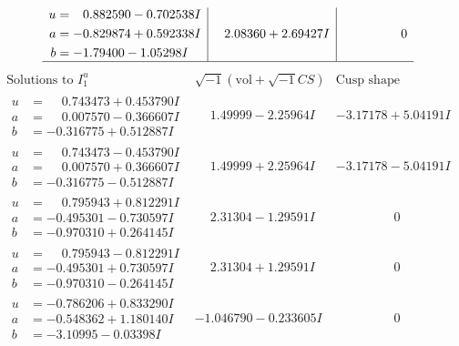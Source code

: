 \documentclass[1p]{elsarticle_modified}
\theoremstyle{definition}
\newcommand{\I}{\sqrt{-1}}
\begin{document}
$$\begin{array}{c|c|c}
\begin{aligned}
u &= \phantom{-}0.882590 - 0.702538 I \\
a &= -0.829874 + 0.592338 I \\
b &= -1.79400 - 1.05298 I\end{aligned}
 & \phantom{-}2.08360 + 2.69427 I & \phantom{-0.000000 } 0\\
 \hline 
 \end{array}$$\newpage$$\begin{array}{c|c|c}  
\text{Solutions to }I^u_{1}& \I (\text{vol} + \sqrt{-1}CS) & \text{Cusp shape}\\
 \hline 
\begin{aligned}
u &= \phantom{-}0.743473 + 0.453790 I \\
a &= \phantom{-}0.007570 - 0.366607 I \\
b &= -0.316775 + 0.512887 I\end{aligned}
 & \phantom{-}1.49999 - 2.25964 I & -3.17178 + 5.04191 I \\ \hline\begin{aligned}
u &= \phantom{-}0.743473 - 0.453790 I \\
a &= \phantom{-}0.007570 + 0.366607 I \\
b &= -0.316775 - 0.512887 I\end{aligned}
 & \phantom{-}1.49999 + 2.25964 I & -3.17178 - 5.04191 I \\ \hline\begin{aligned}
u &= \phantom{-}0.795943 + 0.812291 I \\
a &= -0.495301 - 0.730597 I \\
b &= -0.970310 + 0.264145 I\end{aligned}
 & \phantom{-}2.31304 - 1.29591 I & \phantom{-0.000000 } 0 \\ \hline\begin{aligned}
u &= \phantom{-}0.795943 - 0.812291 I \\
a &= -0.495301 + 0.730597 I \\
b &= -0.970310 - 0.264145 I\end{aligned}
 & \phantom{-}2.31304 + 1.29591 I & \phantom{-0.000000 } 0 \\ \hline\begin{aligned}
u &= -0.786206 + 0.833290 I \\
a &= -0.548362 + 1.180140 I \\
b &= -3.10995 - 0.03398 I\end{aligned}
 & -1.046790 - 0.233605 I & \phantom{-0.000000 } 0 \\ \hline\begin{aligned}

\end{aligned}
\end{array}$$
\end{document}

